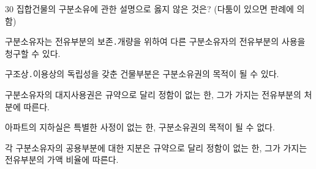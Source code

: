 \begin{question}{30}
집합건물의 구분소유에 관한 설명으로 옳지 않은 것은? (다툼이 있으면 판례에 의함)
\begin{choices}
  \item 구분소유자는 전유부분의 보존․개량을 위하여 다른 구분소유자의 전유부분의 사용을 청구할 수 있다.
  \item 구조상․이용상의 독립성을 갖춘 건물부분은 구분소유권의 목적이 될 수 있다.
  \item 구분소유자의 대지사용권은 규약으로 달리 정함이 없는 한, 그가 가지는 전유부분의 처분에 따른다.
  \item 아파트의 지하실은 특별한 사정이 없는 한, 구분소유권의 목적이 될 수 없다.
  \item 각 구분소유자의 공용부분에 대한 지분은 규약으로 달리 정함이 없는 한, 그가 가지는 전유부분의 가액 비율에 따른다.
\end{choices}
\end{question}
